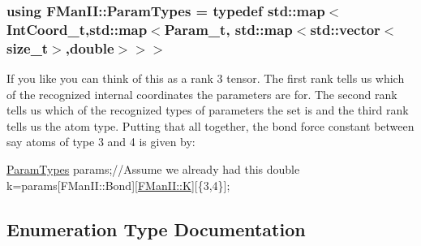 \subsubsection[{\texorpdfstring{Param\+Types}{ParamTypes}}]{\setlength{\rightskip}{0pt plus 5cm}using {\bf F\+Man\+I\+I\+::\+Param\+Types} = typedef std\+::map$<${\bf Int\+Coord\+\_\+t},std\+::map$<${\bf Param\+\_\+t}, std\+::map$<$std\+::vector$<$size\+\_\+t$>$,double$>$$>$$>$}\hypertarget{namespaceFManII_a16edca665b5dfcdf9b3995844ad01bb5}{}\label{namespaceFManII_a16edca665b5dfcdf9b3995844ad01bb5}
If you like you can think of this as a rank 3 tensor. The first rank tells us which of the recognized internal coordinates the parameters are for. The second rank tells us which of the recognized types of parameters the set is and the third rank tells us the atom type. Putting that all together, the bond force constant between say atoms of type 3 and 4 is given by\+: 
\begin{DoxyCode}
\hyperlink{namespaceFManII_a16edca665b5dfcdf9b3995844ad01bb5}{ParamTypes} params;\textcolor{comment}{//Assume we already had this}
\textcolor{keywordtype}{double} k=params[FManII::Bond][\hyperlink{namespaceFManII_ab331802fde4c5f2564443f1704c25363acce4c4e3a7008d8a210e0950f0ae6646}{FManII::K}][\{3,4\}];
\end{DoxyCode}
 

\subsection{Enumeration Type Documentation}
